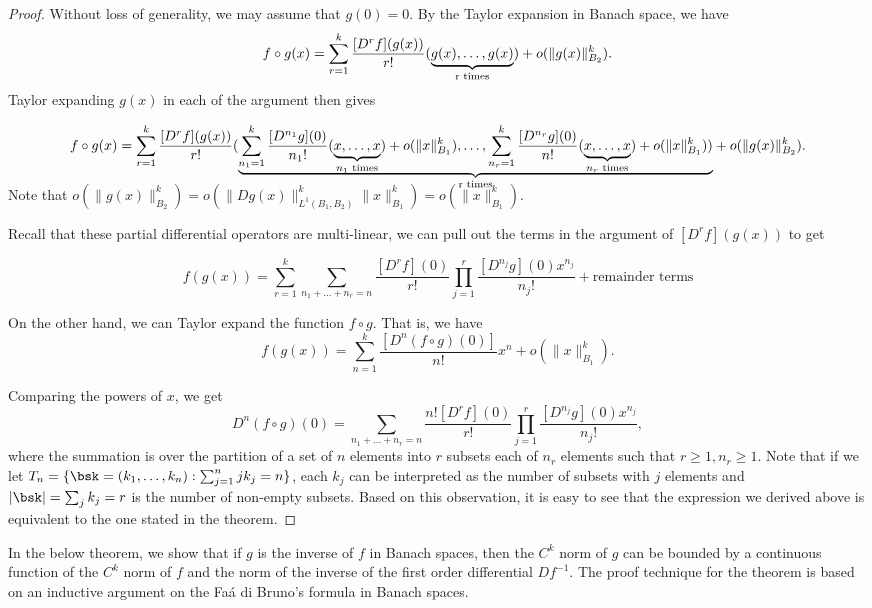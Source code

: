 \begin{proof}
Without loss of generality, we may assume that $g(0) = 0$. By the Taylor expansion in Banach space, we have 
$$f\circ g(x) =  \sum_{r=1}^k\frac{[D^rf](g(x))}{r!}(\smash[b]{\underbrace{g(x),\ldots, g(x)}_\text{r times}}) + o(\|g(x)\|_{B_2}^k).$$

Taylor expanding $g(x)$ in each of the argument then gives 

$$f\circ g(x) =  \sum_{r=1}^k\frac{[D^rf](g(x))}{r!}(\smash[b]{\underbrace{\sum_{n_1=1}^k\frac{[D^{n_1}g](0)}{n_1!}(\smash[b]{\underbrace{x,\ldots,x}_\text{$n_1$ times}}) + o(\|x\|_{B_1}^k),\ldots, \sum_{n_r= 1}^k\frac{[D^{n_r}g](0)}{n!}(\smash[b]{\underbrace{x,\ldots,x}_\text{$n_r$ times}})+
o(\|x\|_{B_1}^k))}_\text{r times}} + o(\|g(x)\|_{B_2}^k).$$

\newline





Note that $o(\|g(x)\|_{B_2}^k) = o(\|Dg(x)\|_{L^1(B_1, B_2)}^k\|x\|_{B_1}^k) = o(\|x\|_{B_1}^k)$.


Recall that these partial differential operators are multi-linear, we can pull out the terms in the argument of $[D^rf](g(x))$ to get 





$$f(g(x)) = \sum_{r=1}^k\sum_{n_1+\ldots+n_r = n}\frac{[D^rf](0)}{r!}\prod_{j=1}^r\frac{[D^{n_j}g](0)x^{n_j}}{n_j!} + \text{remainder terms} $$

On the other hand, we can Taylor expand the function $f\circ g$. That is, we have 
$$f(g(x)) = \sum_{n = 1}^k\frac{[D^n(f\circ g)(0)]}{n!}x^n + o(\|x\|_{B_1}^k). $$

Comparing the powers of $x$, we get 
$$D^n(f\circ g)(0) = \sum_{n_1+\ldots+n_r = n}\frac{n![D^rf](0)}{r!}\prod_{j=1}^r\frac{[D^{n_j}g](0)x^{n_j}}{n_j!},$$ where the summation is over the partition of a set of $n$ elements into $r$ subsets each of $n_r$ elements such that $r \geq 1, n_r\geq 1$. Note that if we let $T_n = \{\bsk = (k_1,\ldots,k_n) : \sum_{j=1}^n jk_j = n\}$, each $k_j$ can be interpreted as the number of subsets with $j$ elements and $|\bsk| = \sum_j k_j = r$ is the number of non-empty subsets. Based on this observation, it is easy to see that the expression we derived above is equivalent to the one stated in the theorem.
\end{proof}


In the below theorem, we show that if $g$ is the inverse of $f$ in Banach spaces, then the $C^k$ norm of $g$ can be bounded by a continuous function of the $C^k$ norm of $f$ and the norm of the inverse of the first order differential $Df^{-1}$. The proof technique for the theorem is based on an inductive argument on the Fa\'{a} di Bruno's formula in Banach spaces. 



